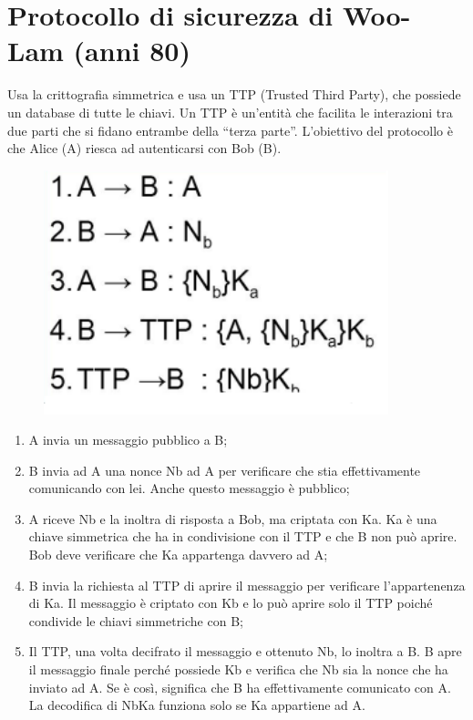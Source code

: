 \section{Protocollo di sicurezza di Woo-Lam (anni 80)}

Usa la crittografia simmetrica e usa un TTP (Trusted Third Party), che 
possiede un database di
tutte le chiavi. Un TTP è un'entità che facilita le interazioni tra due
parti che si fidano entrambe
della “terza parte”.
L'obiettivo del protocollo è che Alice (A) riesca ad autenticarsi
con Bob (B).

\begin{figure}[H]
    \centering
    \includegraphics[width=10cm, keepaspectratio]{capitoli/crittografia/imgs/Mulan.png}
\end{figure}

\begin{enumerate}
    \item A invia un messaggio pubblico a B;
    \item B invia ad A una nonce Nb ad A per verificare che stia
          effettivamente comunicando con lei. Anche questo messaggio è
          pubblico;
    \item A riceve Nb e la inoltra di risposta a Bob, ma criptata con
          Ka. Ka è una chiave simmetrica che ha in condivisione con il
          TTP e che B non può aprire. Bob deve verificare che Ka
          appartenga davvero ad A;
    \item B invia la richiesta al TTP di aprire il messaggio per verificare
          l’appartenenza di Ka. Il
          messaggio è criptato con Kb e lo può aprire solo il TTP poiché condivide
          le chiavi
          simmetriche con B;
    \item Il TTP, una volta decifrato il messaggio e ottenuto Nb, lo inoltra a B.
          B apre il messaggio
          finale perché possiede Kb e verifica che Nb sia la nonce che ha inviato ad A. 
          Se è così,
          significa che B ha effettivamente comunicato con A. La decodifica di {Nb}Ka 
          funziona solo se Ka appartiene ad A.
\end{enumerate}

